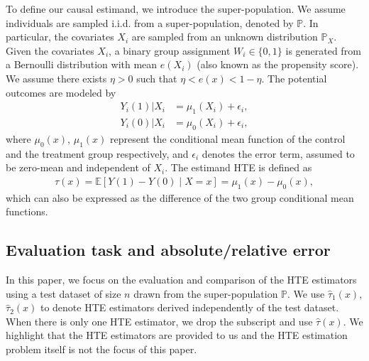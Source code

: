 \documentclass[twoside]{article}
\newcommand{\1}{{\mathbbm{1}}}
\def\EE{\mathbb{E}}
\def\PP{\mathbb{P}}
\begin{document}
To define our causal estimand, we introduce the super-population. 
We assume individuals are sampled i.i.d. from a super-population, denoted by $\PP$.
In particular, the covariates $X_i$ are sampled from an unknown distribution $\PP_X$. 
Given the covariates $X_i$, a binary group assignment $W_i \in \{0, 1\}$ is generated from a Bernoulli distribution with mean $e(X_i)$ (also known as the propensity score). 
We assume there exists $\eta > 0$  such that $\eta < e(x) < 1 - \eta$.
The potential outcomes are modeled by
\begin{align*}
    Y_i(1) | X_i &= \mu_1(X_i) + \epsilon_i, \\
    Y_i(0) | X_i &= \mu_0(X_i) + \epsilon_i,  
\end{align*}
where $\mu_0(x)$, $\mu_1(x)$ represent the conditional mean function of the control and the treatment group respectively, and $\epsilon_i$ denotes the error term, assumed to be zero-mean and independent of $X_i$. 
The estimand HTE is defined as 
\begin{align*}
    \tau(x) = \EE\left[Y(1) - Y(0) \mid X = x\right] 
    = \mu_1(x) - \mu_0(x),
\end{align*}
which can also be expressed as the difference of the two group conditional mean functions.


\subsection{Evaluation task and absolute/relative error}\label{sec:error.definition}


In this paper, we focus on the evaluation and comparison of the HTE estimators using a test dataset of size $n$ drawn from the super-population $\PP$.
We use $\hat{\tau}_1(x)$, $\hat{\tau}_2(x)$ to denote HTE estimators derived independently of the test dataset.
When there is only one HTE estimator, we drop the subscript and use $\hat{\tau}(x)$.
We highlight that the HTE estimators are provided to us and the HTE estimation problem itself is not the focus of this paper.
\end{document}
